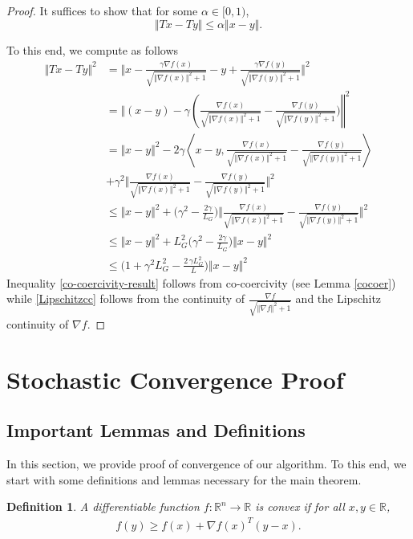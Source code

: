 \documentclass{article}
\newtheorem{definition}{Definition}
\begin{document}
\begin{proof}
It suffices to show that for some $\alpha \in [0,1)$,
\begin{equation}
    \Vert Tx - Ty \Vert \le \alpha \Vert x - y \Vert.
\end{equation}

\noindent
To this end, we compute as follows
\begin{align}
\Vert Tx - Ty \Vert^2  &= \bigg\Vert x - \frac{\gamma\nabla f(x)}{\sqrt{\Vert\nabla f(x)\Vert^2 +1}}-y + \frac{\gamma\nabla f(y)}{\sqrt{\Vert\nabla f(y)\Vert^2 +1}}\bigg\Vert^2 \nonumber\\
&=\bigg\Vert (x -y)- \gamma\left ( \frac{\nabla f(x)}{\sqrt{\Vert\nabla f(x) \Vert^2 +1}} - \frac{\nabla f(y)}{\sqrt{\Vert\nabla f(y)\Vert^2 +1}} \bigg )\right\Vert^2 \nonumber\\
&= \Vert x -y\Vert^2 - 2\gamma \left \langle x -y,\frac{\nabla f(x)}{\sqrt{\Vert\nabla f(x)\Vert^2 +1}} - \frac{\nabla f(y)}{\sqrt{\Vert\nabla f(y)\Vert^2 +1} }\right \rangle \nonumber\\
&+\gamma^2\bigg\Vert \frac{\nabla f(x)}{\sqrt{\Vert\nabla f(x)\Vert^2 +1}} - \frac{\nabla f(y)}{\sqrt{\Vert\nabla f(y) \Vert^2 +1}} \bigg\Vert^2 \nonumber\\
%
 & \leq \bigg\Vert x -y\bigg\Vert^2+\bigg ( \gamma^2- \frac{2\gamma}{L_G} \bigg )\Bigg \Vert \frac{\nabla f(x)}{\sqrt{\Vert\nabla f(x)\Vert^2 +1}} - \frac{\nabla f(y)}{\sqrt{\Vert\nabla f(y)\Vert^2 +1}} \Bigg\Vert^2 \label{co-coercivity-result}\\
&\leq \Vert x - y \Vert^2 + L_G^2 \bigg ( \gamma^2- \frac{2\gamma}{L_G} \bigg ) \Vert x -y \Vert^2 \label{Lipschitzcc}\\
& \le  \bigg (1 + \gamma^2 L_G^2- \frac{2 \, \gamma L_G^2}{L} \bigg ) \Vert x -y \Vert^2 
\end{align}
Inequality \eqref{co-coercivity-result} follows from co-coercivity (see Lemma \ref{cocoer}) while \ref{Lipschitzcc} follows from the continuity of $\displaystyle \frac{\nabla f}{\sqrt{\Vert \nabla f \Vert^2 + 1}} $ and the Lipschitz continuity of $\nabla f$.
\end{proof}


\section{Stochastic Convergence Proof}\label{proof-stochastic}
\subsection{Important Lemmas and Definitions}
In this section, we provide proof of convergence of our algorithm. To this end, we start with some definitions and lemmas necessary for the main theorem.
\begin{definition}
A differentiable function $f:\mathbb{R}^n \to \mathbb{R}$ is convex if for all $x,y \in \mathbb{R}$, 
\begin{align}
    f(y) \ge f(x) + \nabla f(x)^T (y-x).
\end{align}
\end{definition}
\end{document}
